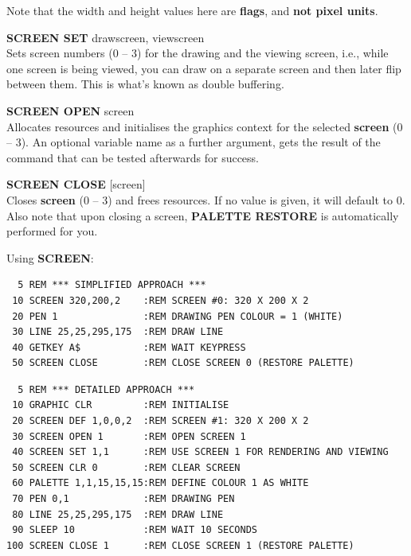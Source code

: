 \begin{description}[leftmargin=2cm,style=nextline]
                Note that the width and height values here are {\bf flags},
                and {\bf not pixel units}.

                {\bf SCREEN SET} drawscreen, viewscreen \\
                Sets screen numbers
                (0 -- 3) for the drawing and the viewing screen, i.e.,
                while one screen is being viewed, you can draw on a
                separate screen and then later flip between them. This
                is what's known as double buffering.

                {\bf SCREEN OPEN} screen \\
                Allocates resources and
                initialises the graphics context for the selected
                {\bf screen} (0 -- 3).  An optional variable name as
                a further argument, gets the result of the
                command that can be tested afterwards for success.

                {\bf SCREEN CLOSE} [screen] \\
                Closes {\bf screen} (0 -- 3) and frees resources. If no value is given,
                it will default to 0. Also note that upon closing a screen,
                {\bf PALETTE RESTORE} is automatically performed for you.

\item [Examples:] Using {\bf SCREEN}:
\begin{tcolorbox}[colback=black,coltext=white]
\verbatimfont{\codefont}
\begin{verbatim}
  5 REM *** SIMPLIFIED APPROACH ***
 10 SCREEN 320,200,2    :REM SCREEN #0: 320 X 200 X 2
 20 PEN 1               :REM DRAWING PEN COLOUR = 1 (WHITE)
 30 LINE 25,25,295,175  :REM DRAW LINE
 40 GETKEY A$           :REM WAIT KEYPRESS
 50 SCREEN CLOSE        :REM CLOSE SCREEN 0 (RESTORE PALETTE)
\end{verbatim}
\end{tcolorbox}
\begin{tcolorbox}[colback=black,coltext=white]

\verbatimfont{\codefont}
\begin{verbatim}
  5 REM *** DETAILED APPROACH ***
 10 GRAPHIC CLR         :REM INITIALISE
 20 SCREEN DEF 1,0,0,2  :REM SCREEN #1: 320 X 200 X 2
 30 SCREEN OPEN 1       :REM OPEN SCREEN 1
 40 SCREEN SET 1,1      :REM USE SCREEN 1 FOR RENDERING AND VIEWING
 50 SCREEN CLR 0        :REM CLEAR SCREEN
 60 PALETTE 1,1,15,15,15:REM DEFINE COLOUR 1 AS WHITE
 70 PEN 0,1             :REM DRAWING PEN
 80 LINE 25,25,295,175  :REM DRAW LINE
 90 SLEEP 10            :REM WAIT 10 SECONDS
100 SCREEN CLOSE 1      :REM CLOSE SCREEN 1 (RESTORE PALETTE)
\end{verbatim}
\end{tcolorbox}
\end{description}

